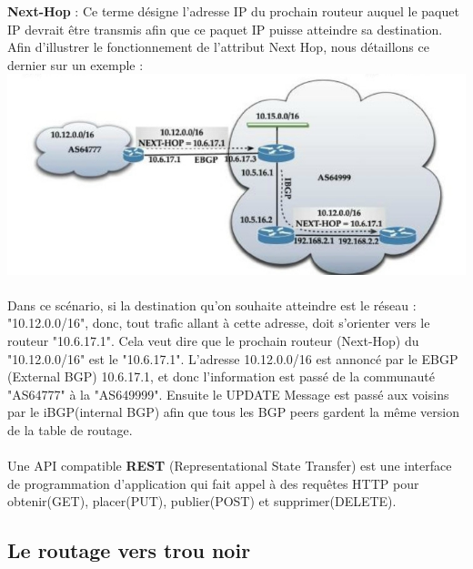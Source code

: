 \pagebreak
\textbf{Next-Hop}\cite{Routing_BGP} : Ce terme désigne l'adresse IP du prochain routeur auquel le paquet IP devrait être transmis afin que ce paquet IP puisse atteindre sa destination.
\newline
Afin d'illustrer le fonctionnement de l'attribut Next Hop, nous détaillons ce dernier sur un exemple :  
\newline
\includegraphics[scale = 0.5]{img/nextHope.jpg}
\\
\\
  Dans ce scénario, si la destination qu'on souhaite atteindre est le réseau : "10.12.0.0/16", donc, tout trafic allant à cette adresse, doit s'orienter vers le routeur "10.6.17.1". Cela veut dire que le prochain routeur (Next-Hop) du "10.12.0.0/16" est le "10.6.17.1".
\newline
L'adresse 10.12.0.0/16 est annoncé par le EBGP (External BGP) 10.6.17.1, et donc l'information est passé de la communauté "AS64777" à la "AS649999". Ensuite le UPDATE Message est passé aux voisins par le iBGP(internal BGP) afin que tous les BGP peers gardent la même version de la table de routage. 
\\
\\
Une API compatible \textbf{REST} (Representational State Transfer) est une interface de programmation d'application qui fait appel à des requêtes HTTP pour obtenir(GET), placer(PUT), publier(POST) et supprimer(DELETE).

\subsection{Le routage vers trou noir \cite{Cisco}} 


